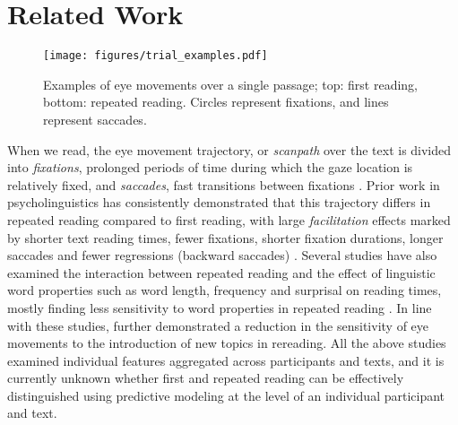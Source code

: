 \section{Related Work}
\label{sec:related-work}

\begin{figure}
    \centering
    \texttt{[image: figures/trial\_examples.pdf]}
    \caption{Examples of eye movements over a single passage; top: first reading, bottom: repeated reading. Circles represent fixations, and lines represent saccades.}
    \label{fig:trial-example}
\end{figure}

When we read, the eye movement trajectory, or \emph{scanpath} over the text is divided into \emph{fixations}, prolonged periods of time during which the gaze location is relatively fixed, and \emph{saccades}, fast transitions between fixations \cite{rayner1998eye,schotter2025beginner}. Prior work in psycholinguistics has consistently demonstrated that this trajectory differs in repeated reading compared to first reading, with large \emph{facilitation} effects marked by shorter text reading times, fewer fixations, shorter fixation durations, longer saccades and fewer regressions (backward saccades) \citep{hyona1990repeated,raney1995freq,schnitzer2006,meiri2024deja}. Several studies have also examined the interaction between repeated reading and the effect of linguistic word properties such as word length, frequency and surprisal on reading times, mostly finding less sensitivity to word properties in repeated reading \citep{raney1995freq,foster2013repeated,zawoyski2015repeated,meiri2024deja}. In line with these studies, \citet{hyona1990repeated} further demonstrated a reduction in the sensitivity of eye movements to the introduction of new topics in rereading. All the above studies examined individual features aggregated across participants and texts, and it is currently unknown whether first and repeated reading can be effectively distinguished using predictive modeling at the level of an individual participant and text.


